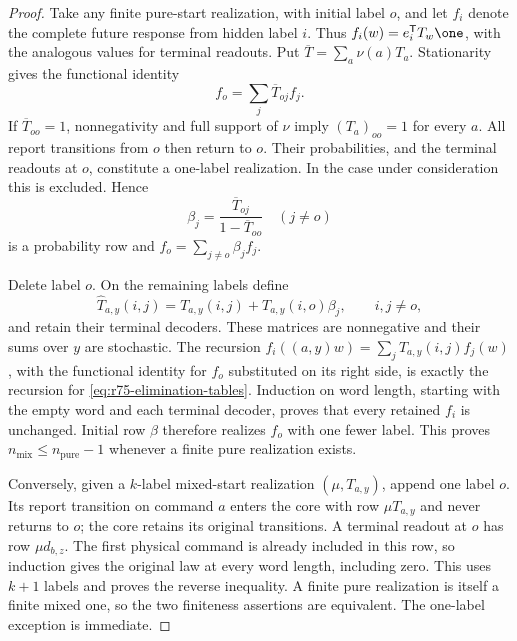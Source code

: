 \begin{proof}
Take any finite pure-start realization, with initial label $o$, and let
$f_i$ denote the complete future response from hidden label $i$.  Thus
$f_i(w)=e_i^{\mathsf T}T_w\one$, with the analogous values for terminal
readouts.  Put $\overline T=\sum_a\nu(a)T_a$.  Stationarity gives the
functional identity
\begin{equation}\label{eq:r75-initial-functional-identity}
 f_o=\sum_j\overline T_{oj}f_j.
\end{equation}
If $\overline T_{oo}=1$, nonnegativity and full support of $\nu$ imply
$(T_a)_{oo}=1$ for every $a$.  All report transitions from $o$ then return
to $o$.  Their probabilities, and the terminal readouts at $o$, constitute
a one-label realization.  In the case under consideration this is
excluded.  Hence
\[
 \beta_j=\frac{\overline T_{oj}}{1-\overline T_{oo}}\quad(j\ne o)
\]
is a probability row and $f_o=\sum_{j\ne o}\beta_jf_j$.

Delete label $o$.  On the remaining labels define
\begin{equation}\label{eq:r75-elimination-tables}
 \widehat T_{a,y}(i,j)
   =T_{a,y}(i,j)+T_{a,y}(i,o)\beta_j,
 \qquad i,j\ne o,
\end{equation}
and retain their terminal decoders.  These matrices are nonnegative and
their sums over $y$ are stochastic.  The recursion
$f_i((a,y)w)=\sum_jT_{a,y}(i,j)f_j(w)$, with the functional identity for
$f_o$ substituted on its right side, is exactly the recursion for
\eqref{eq:r75-elimination-tables}.  Induction on word length, starting with
the empty word and each terminal decoder, proves that every retained
$f_i$ is unchanged.  Initial row $\beta$ therefore realizes $f_o$ with
one fewer label.  This proves $n_{\mathrm{mix}}\le
n_{\mathrm{pure}}-1$ whenever a finite pure realization exists.

Conversely, given a $k$-label mixed-start realization $(\mu,T_{a,y})$,
append one label $o$.  Its report transition on command $a$ enters the
core with row $\mu T_{a,y}$ and never returns to $o$; the core retains its
original transitions.  A terminal readout at $o$ has row $\mu d_{b,z}$.
The first physical command is already included in this row, so induction
gives the original law at every word length, including zero.  This uses
$k+1$ labels and proves the reverse inequality.  A finite pure realization
is itself a finite mixed one, so the two finiteness assertions are
equivalent.  The one-label exception is immediate.
\end{proof}

